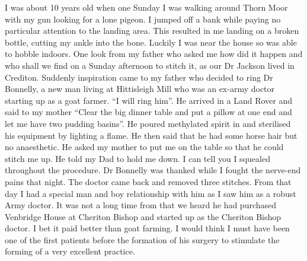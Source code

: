 
I was about 10 years old when one Sunday I was walking around Thorn Moor with my
gun looking for a lone pigeon. I jumped off a bank while paying no particular
attention to the landing area. This resulted in me landing on a broken bottle,
cutting my ankle into the bone. Luckily I was near the house so was able to
hobble indoors. One look from my father who asked me how did it happen and who
shall we find on a Sunday afternoon to stitch it, as our Dr Jackson lived in
Crediton. Suddenly inspiration came to my father who decided to ring Dr
Bonnelly, a new man living at Hittisleigh Mill who was an ex-army doctor
starting up as a goat farmer. ``I will ring him''. He arrived in a Land Rover
and said to my mother ``Clear the big dinner table and put a pillow at one end
and let me have two pudding basins''. He poured methylated spirit in and
sterilised his equipment by lighting a flame. He then said that he had some
horse hair but no anaesthetic. He asked my mother to put me on the table so
that he could stitch me up. He told my Dad to hold me down. I can tell you I
squealed throughout the procedure. Dr Bonnelly was thanked while I fought the
nerve-end pains that night. The doctor came back and removed three stitches.
From that day I had a special man and boy relationship with him as I saw him as
a robust Army doctor. It was not a long time from that we heard he had
purchased Venbridge House at Cheriton Bishop and started up as the Cheriton
Bishop doctor. I bet it paid better than goat farming. I would think I must
have been one of the first patients before the formation of his surgery to
stimulate the forming of a very excellent practice.

